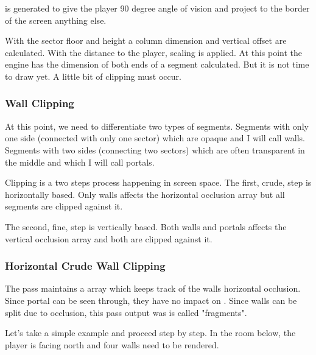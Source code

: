 \par
{} is generated to give the player 90 degree angle of vision and project to the border of the screen anything else. 
\par
{}
\par
With the sector floor and height a column dimension and vertical offset are calculated. With the distance to the player, scaling is applied. At this point the engine has the dimension of both ends of a segment calculated. But it is not time to draw yet. A little bit of clipping must occur. 






\subsubsection{Wall Clipping}
At this point, we need to differentiate two types of segments. Segments with only one side (connected with only one sector) which are opaque and I will call walls. Segments with two sides (connecting two sectors) which are often transparent in the middle and which I will call portals.\\
\par
Clipping is a two steps process happening in screen space. The first, crude, step is horizontally based. Only walls affects the horizontal occlusion array but all segments are clipped against it.\\
\par
The second, fine, step is vertically based. Both walls and portals affects the vertical occlusion array and both are clipped against it.\\
\par
\pagebreak

\subsubsection{Horizontal Crude Wall Clipping}
The pass maintains a  array which keeps track of the walls horizontal occlusion. Since portal can be seen through, they have no impact on . Since walls can be split due to occlusion, this pass output was is called "fragments".\\
\par
{}
\par
Let's take a simple example and proceed step by step. In the room below, the player is facing north and four walls need to be rendered.
\par
{}
\par

